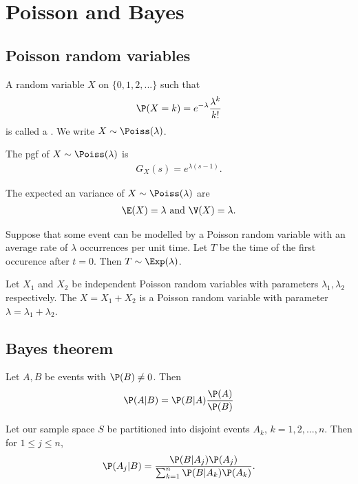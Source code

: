 \documentclass{article}
\begin{document}
\section{Poisson and Bayes}
\subsection{Poisson random variables}
\begin{definition}
    A random variable $X$ on $\{0,1,2,...\}$ such that
    \begin{align*}
        \P(X=k) = e^{-\lambda}\frac{\lambda^k}{k!}
    \end{align*}
    is called a .
    We write $X\sim\Poiss(\lambda)$.
\end{definition}
\begin{lemma}
    The pgf of $X\sim\Poiss(\lambda)$ is
    \begin{align*}
        G_X(s) = e^{\lambda(s-1)}.
    \end{align*}
\end{lemma}
\begin{lemma}
    The expected an variance of $X\sim\Poiss(\lambda)$ are
    \begin{align*}
        \E(X) = \lambda \text{ and } \V(X) = \lambda.
    \end{align*}
\end{lemma}
\begin{theorem}
    Suppose that some event can be modelled by a Poisson random variable
    with an average rate of $\lambda$ occurrences per unit time. Let $T$
    be the time of the first occurence after $t=0$. Then $T\sim\Exp(\lambda)$.
\end{theorem}
\begin{theorem}
    Let $X_1$ and $X_2$ be independent Poisson random variables with parameters
    $\lambda_1, \lambda_2$ respectively. The $X=X_1 + X_2$ is a Poisson random
    variable with parameter $\lambda=\lambda_1+\lambda_2$.
\end{theorem}
\subsection{Bayes theorem}
\begin{theorem}
    Let $A,B$ be events with $\P(B)\not=0$. Then
    \begin{align*}
        \P(A|B)=\P(B|A)\frac{\P(A)}{\P(B)}
    \end{align*}
\end{theorem}
\begin{theorem}
    Let our sample space $S$ be partitioned into disjoint events $A_k$,
    $k=1,2,...,n$. Then for $1\leq j\leq n$,
    \begin{align*}
        \P(A_j|B)=\frac{\P(B|A_j)\P(A_j)}{\sum_{k=1}^n \P(B|A_k)\P(A_k)}.
    \end{align*}
\end{theorem}
\end{document}
